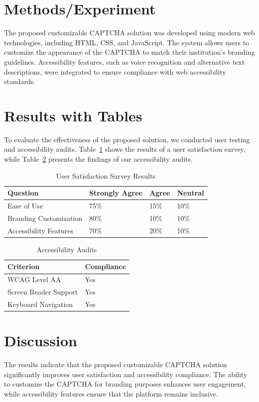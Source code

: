 \documentclass{article}
\begin{document}
\section{Methods/Experiment}
The proposed customizable CAPTCHA solution was developed using modern web technologies, including HTML, CSS, and JavaScript. The system allows users to customize the appearance of the CAPTCHA to match their institution's branding guidelines. Accessibility features, such as voice recognition and alternative text descriptions, were integrated to ensure compliance with web accessibility standards.

\section{Results with Tables}
To evaluate the effectiveness of the proposed solution, we conducted user testing and accessibility audits. Table~\ref{table:user_satisfaction} shows the results of a user satisfaction survey, while Table~\ref{table:accessibility_compliance} presents the findings of our accessibility audits.

\begin{table}[ht]
\centering
\caption{User Satisfaction Survey Results}
\label{table:user_satisfaction}
\begin{tabular}{@{}llll@{}}
\toprule
\textbf{Question} & \textbf{Strongly Agree} & \textbf{Agree} & \textbf{Neutral} \\ \midrule
Ease of Use & 75\% & 15\% & 10\% \\
Branding Customization & 80\% & 10\% & 10\% \\
Accessibility Features & 70\% & 20\% & 10\% \\ \bottomrule
\end{tabular}
\end{table}

\begin{table}[ht]
\centering
\caption{Accessibility Audits}
\label{table:accessibility_compliance}
\begin{tabular}{@{}ll@{}}
\toprule
\textbf{Criterion} & \textbf{Compliance} \\ \midrule
WCAG Level AA & Yes \\
Screen Reader Support & Yes \\
Keyboard Navigation & Yes \\ \bottomrule
\end{tabular}
\end{table}

\section{Discussion}
The results indicate that the proposed customizable CAPTCHA solution significantly improves user satisfaction and accessibility compliance. The ability to customize the CAPTCHA for branding purposes enhances user engagement, while accessibility features ensure that the platform remains inclusive.
\end{document}
